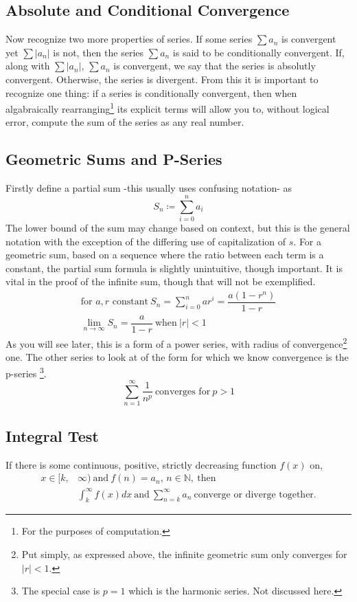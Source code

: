 \documentclass[11pt]{scrreprt}
\newcommand{\define}{\coloneqq}
\newcommand{\innat}{\in\mathbb{N}}
\begin{document}
	\subsection*{Absolute and Conditional Convergence}
		Now recognize two more properties of series. If some series $\sum a_n$ is convergent yet $\sum |a_n|$ is not, then the series $\sum a_n$
		is said to be conditionally convergent. If, along with $\sum |a_n|$, $\sum a_n$ is convergent, we say that the series is absolutly
		convergent. Otherwise, the series is divergent. From this it is important to recognize one thing: if a series is conditionally convergent,
		then when algabraically rearranging\footnote{For the purposes of computation.} its explicit terms will allow you to, 
		without logical error, compute the sum of the series as any real number.

	\subsection*{Geometric Sums and P-Series}
		Firstly define a partial sum -this usually uses confusing notation- as
			\begin{equation}
				S_n \define \sum_{i = 0}^{n}a_i
			\end{equation}
		The lower bound of the sum may change based on context, but this is the general notation with the exception of the differing use of capitalization
		of $s$. For a geometric sum, based on a sequence where the ratio between each term is a constant, the partial sum formula is slightly unintuitive,
		though important. It is vital in the proof of the infinite sum, though that will not be exemplified.
			\begin{gather}
				\text{for $a,r$ constant} \ S_n= \sum_{i = 0}^{n} ar^i = \dfrac{a(1-r^n)}{1-r} \\
				\lim_{n\to\infty} S_n = \dfrac{a}{1-r} \ \text{when} \ |r| < 1 
			\end{gather}
		As you will see later, this is a form of a power series, with radius of convergence\footnote{Put simply, as expressed above, the infinite
		geometric sum only converges for $|r| < 1$.} one. The other series to look at of the form for which we know convergence is the p-series
		\footnote{The special case is $p = 1$ which is the harmonic series. Not discussed here.}. 
			\begin{equation}
				\sum_{n=1}^{\infty} \frac{1}{n^p} \ \text{converges for}\ p > 1
			\end{equation}

	\subsection*{Integral Test}
		If there is some continuous, positive, strictly decreasing function $f(x)$ on,
			\begin{align}
				x\in[k,&\infty)\ \text{and}\ f(n) = a_n,\, n\innat,\ \text{then}\\
				&\int_{k}^{\infty} f(x)dx\ \text{and}\ \sum_{n = k}^{\infty} a_n\ \text{converge or diverge together.}
			\end{align}
\end{document}
